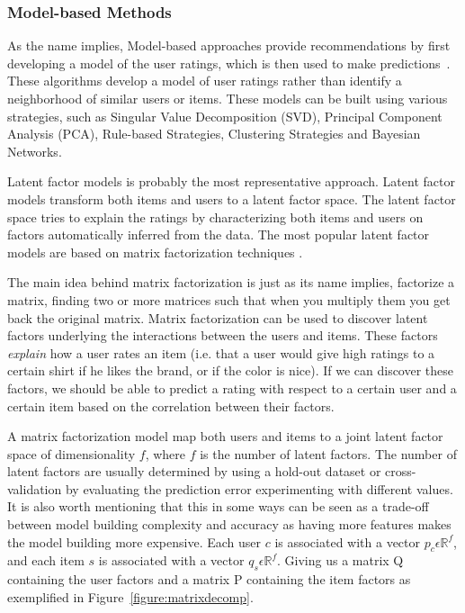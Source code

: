 \subsubsection{Model-based Methods}
\label{sec:model-based-methods}

As the name implies, Model-based approaches provide recommendations by first
developing a model of the user ratings, which is then used to make predictions~\cite{Su:2009:SCF:1592474.1722966}.
These algorithms develop a model of user ratings rather than identify a
neighborhood of similar users or items. These models can be built using various
strategies, such as Singular Value Decomposition (SVD), Principal Component
Analysis (PCA), Rule-based Strategies, Clustering Strategies and Bayesian
Networks.

Latent factor models is probably the most representative approach. Latent
factor models transform both items and users to a latent factor space. The
latent factor space tries to explain the ratings by characterizing both items
and users on factors automatically inferred from the data. The most popular
latent factor models are based on matrix factorization techniques
\cite{Koren2009}.

The main idea behind matrix factorization is just as its name implies,
factorize a matrix, finding two or more matrices such that when you multiply
them you get back the original matrix. Matrix factorization can be used to
discover latent factors underlying the interactions between the users and
items. These factors \emph{explain} how a user rates an item (i.e. that a user
would give high ratings to a certain shirt if he likes the brand, or if the
color is nice). If we can discover these factors, we should be able to predict
a rating with respect to a certain user and a certain item based on the
correlation between their factors.

A matrix factorization model map both users and items to a joint latent factor
space of dimensionality $f$, where $f$ is the number of latent factors. The
number of latent factors are usually determined by using a hold-out dataset or
cross-validation by evaluating the prediction error experimenting with
different values. It is also worth mentioning that this in some ways can be
seen as a trade-off between model building complexity and accuracy as having
more features makes the model building more expensive. Each user $c$ is
associated with a vector $p_{c} \epsilon \mathbb{R}^{f}$, and each item $s$ is
associated with a vector $q_{s} \epsilon \mathbb{R}^{f}$. Giving us a matrix Q
containing the user factors and a matrix P containing the item factors as
exemplified in Figure~\ref{figure:matrixdecomp}.

